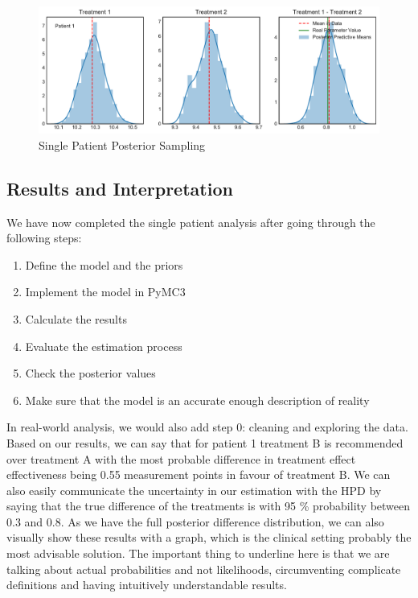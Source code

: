 \documentclass[12pt,a4paper,leqno]{report}
\theoremstyle{plain}
\theoremstyle{definition}
\theoremstyle{remark}
\begin{document}
\bigskip
\begin{figure}[H]
    \caption{Single Patient Posterior Sampling}\label{singlepatientposteriorsampling}
    \bigskip
    \includegraphics[width=\textwidth,height=\textheight,keepaspectratio]{single_patient_posterior_sampling.pdf}
\end{figure}
\bigskip

\subsection{Results and Interpretation}

We have now completed the single patient analysis after going through the following steps:

\begin{enumerate}
    \item Define the model and the priors
    \item Implement the model in PyMC3
    \item Calculate the results
    \item Evaluate the estimation process
    \item Check the posterior values
    \item Make sure that the model is an accurate enough description of reality
\end{enumerate}

In real-world analysis, we would also add step 0: cleaning and exploring the data.
Based on our results, we can say that for patient 1 treatment B is recommended over treatment A
with the most probable difference in treatment effect effectiveness being 0.55
measurement points in favour of treatment B. We can also easily communicate
the uncertainty in our estimation with the HPD by saying that the true difference of
the treatments is with 95 \% probability between 0.3 and 0.8. As we have the full
posterior difference distribution, we can also visually show these results with a graph,
which is the clinical setting probably the most advisable solution. The important thing
to underline here is that we are talking about actual probabilities and not likelihoods,
circumventing complicate definitions and having intuitively understandable results.
\end{document}
